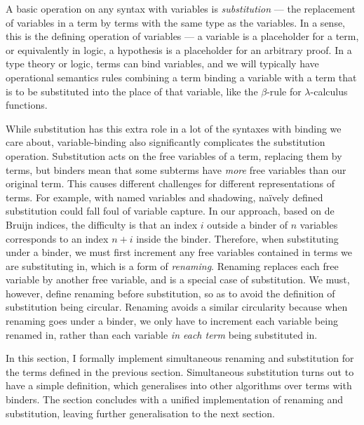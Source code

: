 \def\SimpleKits{../agda/processed-latex/SimpleKits.tex}

%

A basic operation on any syntax with variables is \emph{substitution} --- the
replacement of variables in a term by terms with the same type as the variables.
In a sense, this is the defining operation of variables --- a variable is a
placeholder for a term, or equivalently in logic, a hypothesis is a placeholder
for an arbitrary proof.
In a type theory or logic, terms can bind variables, and we will typically have
operational semantics rules combining a term binding a variable with a term that
is to be substituted into the place of that variable, like the $\beta$-rule for
$\lambda$-calculus functions.

While substitution has this extra role in a lot of the syntaxes with binding we
care about, variable-binding also significantly complicates the substitution
operation.
Substitution acts on the free variables of a term, replacing them by terms, but
binders mean that some subterms have \emph{more} free variables than our
original term.
This causes different challenges for different representations of terms.
For example, with named variables and shadowing, na\"{i}vely defined
substitution could fall foul of variable capture.
In our approach, based on de Bruijn indices, the difficulty is that an index $i$
outside a binder of $n$ variables corresponds to an index $n + i$ inside the
binder.
Therefore, when substituting under a binder, we must first increment any free
variables contained in terms we are substituting in, which is a form of
\emph{renaming}.
Renaming replaces each free variable by another free variable, and is a special
case of substitution.
We must, however, define renaming before substitution, so as to avoid the
definition of substitution being circular.
Renaming avoids a similar circularity because when renaming goes under a binder,
we only have to increment each variable being renamed in, rather than each
variable \emph{in each term} being substituted in.

In this section, I formally implement simultaneous renaming and substitution for
the terms defined in the previous section.
Simultaneous substitution turns out to have a simple definition, which
generalises into other algorithms over terms with binders.
The section concludes with a unified implementation of renaming and
substitution, leaving further generalisation to the next section.

